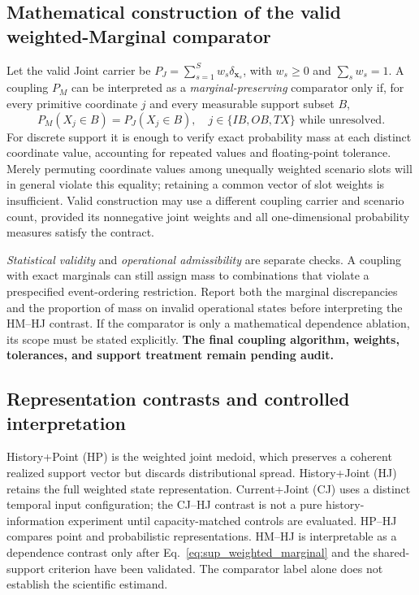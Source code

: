 \documentclass[10pt,a4paper]{article}
\numberwithin{equation}{section}
\begin{document}
\subsection{Mathematical construction of the valid weighted-Marginal comparator}
Let the valid Joint carrier be $P_J=\sum_{s=1}^{S}w_s
\delta_{\mathbf x_s}$, with $w_s\geq0$ and $\sum_s w_s=1$.
A coupling $P_M$ can be interpreted as a \emph{marginal-preserving} comparator only if, for every primitive coordinate $j$ and every measurable support subset $B$,
\begin{equation}
P_M(X_j\in B)=P_J(X_j\in B),\quad j\in\{IB,OB,TX\}
\text{ while unresolved}.
\label{eq:sup_weighted_marginal}
\end{equation}
For discrete support it is enough to verify exact probability mass at each distinct coordinate value, accounting for repeated values and floating-point tolerance. Merely permuting coordinate values among unequally weighted scenario slots will in general violate this equality; retaining a common vector of slot weights is insufficient. Valid construction may use a different coupling carrier and scenario count, provided its nonnegative joint weights and all one-dimensional probability measures satisfy the contract.

\emph{Statistical validity} and \emph{operational admissibility} are separate checks. A coupling with exact marginals can still assign mass to combinations that violate a prespecified event-ordering restriction. Report both the marginal discrepancies and the proportion of mass on invalid operational states before interpreting the HM--HJ contrast. If the comparator is only a mathematical dependence ablation, its scope must be stated explicitly. \textbf{The final coupling algorithm, weights, tolerances, and support treatment remain pending audit.}

\subsection{Representation contrasts and controlled interpretation}
History+Point (HP) is the weighted joint medoid, which preserves a coherent realized support vector but discards distributional spread. History+Joint (HJ) retains the full weighted state representation. Current+Joint (CJ) uses a distinct temporal input configuration; the CJ--HJ contrast is not a pure history-information experiment until capacity-matched controls are evaluated. HP--HJ compares point and probabilistic representations. HM--HJ is interpretable as a dependence contrast only after Eq.~\eqref{eq:sup_weighted_marginal} and the shared-support criterion have been validated. The comparator label alone does not establish the scientific estimand.
\end{document}
